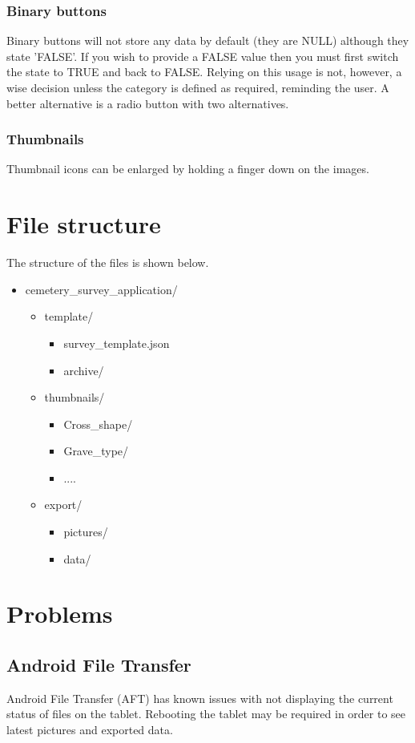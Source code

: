\documentclass{scrreprt}
\begin{document}
\subsection{Binary buttons}
Binary buttons will not store any data by default (they are NULL) although they state 'FALSE'. If you wish to provide a FALSE value then you must first switch the state to TRUE and back to FALSE. Relying on this usage is not, however, a wise decision unless the category is defined as required, reminding the user. A better alternative is a radio button with two alternatives.

\subsection{Thumbnails}
Thumbnail icons can be enlarged by holding a finger down on the images.

\chapter{File structure}
\label{file_structure}
The structure of the files is shown below.

\begin{itemize}
\renewcommand{\labelitemi}{\textbf{}}
\renewcommand{\labelitemii}{\textbf{}}
\renewcommand{\labelitemiii}{\textbf{}}
	\item cemetery_survey_application/
	\begin{itemize}
		\item template/
		\begin{itemize}
			\item survey_template.json
			\item archive/
		\end{itemize}
		\item thumbnails/
		\begin{itemize}
			\item Cross_shape/
			\item Grave_type/
			\item ....
		\end{itemize}
		\item export/
		\begin{itemize}
			\item pictures/
			\item data/
		\end{itemize}
	\end{itemize}
\end{itemize}

\chapter{Problems}
\section{Android File Transfer}
\label{atf}
Android File Transfer (AFT) has known issues with not displaying the current status of files on the tablet. Rebooting the tablet may be required in order to see latest pictures and exported data.
\end{document}
